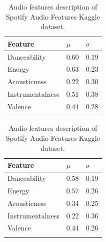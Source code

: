 \documentclass[sn-mathphys]{sn-jnl}%
\theoremstyle{thmstyleone}%
\theoremstyle{thmstyletwo}%
\theoremstyle{thmstylethree}%
\begin{document}
\begin{table}[!ht]
      \begin{minipage}{.5\linewidth}
      \caption{Audio features description of the Last.fm Single-user dataset.}\label{table:audio-features-stats}
            \centering
                  \begin{tabular}{@{}lll@{}}
                  \toprule
                  Feature           & $\mu$ & $\sigma$ \\
                  \midrule
                  Danceability      & 0.60  & 0.19  \\
                  Energy            & 0.63  & 0.23  \\
                  Acousticness      & 0.22  & 0.30  \\
                  Instrumentalness  & 0.51  & 0.38  \\
                  Valence           & 0.44  & 0.28  \\
                  \botrule
                  \end{tabular}
      \end{minipage}
      \begin{minipage}{.5\linewidth}
      \caption{Audio features description of Spotify Audio Features Kaggle dataset.}\label{table:audio-features-stats-kaggle}%
            \centering
                  \begin{tabular}{@{}lll@{}}
                  \toprule
                  Feature           & $\mu$ & $\sigma$ \\
                  \midrule
                  Danceability      & 0.58   & 0.19  \\
                  Energy            & 0.57  & 0.26  \\
                  Acousticness      & 0.34  & 0.25  \\
                  Instrumentalness  & 0.22  & 0.36  \\
                  Valence           & 0.44  & 0.26  \\
                  \botrule
                  \end{tabular}
      \end{minipage}

\end{table}
\end{document}
